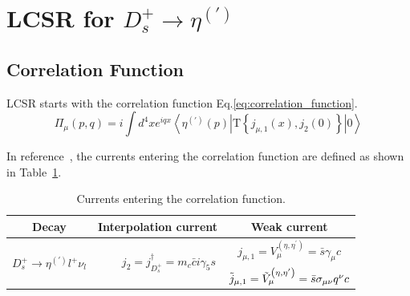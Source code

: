 \graphicspath{{Images/}}

\section{LCSR for $D_{s}^{+}\to\eta^{(\prime)}$}

\subsection{Correlation Function}

LCSR starts with the correlation function Eq.\ref{eq:correlation_function}.
\begin{equation}
    \Pi_\mu(p, q)=i \int d^4 x e^{i q x}\left\langle \eta^{(\prime)}(p)\left|\mathrm{T}\left\{j_{\mu,1}(x), j_{2}(0)\right\}\right| 0\right\rangle
    \label{eq:correlation_function}
\end{equation}

In reference~\cite{JHEP1}, the currents entering the correlation function are defined as shown in Table~\ref{tab:Currents}.

\begin{table}[htbp]
    \centering
    \caption{Currents entering the correlation function\cite{JHEP1}.}
    \vspace{4mm}
    \begin{tabular}{c | c c}
        \hline \hline
        \textbf{Decay}                                                                  & \textbf{Interpolation current}                                                                           & \textbf{Weak current} \\
        \hline
        \multirow{2}{*}{$D_{s}^{+}\rightarrow\eta^{(\prime)}l^{+}\nu_{l}$}              &
        \multirow{2}{5cm}{~~~~$j_{2} = j_{D_s^{+}}^{\dagger}=m_c \bar{c} i \gamma_5 s$} &
        $j_{\mu,1} = V_\mu^{\left(\eta, \eta^{\prime}\right)}=\bar{s} \gamma_\mu c$                                                                                                                                        \\
                                                                                        &
                                                                                        & $\Tilde{j}_{\mu,1} = \Tilde{V}_\mu^{\left(\eta, \eta^{\prime}\right)}=\bar{s} \sigma_{\mu\nu} q^{\nu} c$                         \\
        \hline\hline
    \end{tabular}
    \label{tab:Currents}
\end{table}

